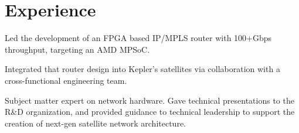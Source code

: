 \documentclass[10pt]{deedy-resume-reversed}
\begin{document}
\begin{minipage}[t]{1.0\textwidth}


\vspace{\topsep} %
\section{Experience}
\newline
{}
\vspace{\topsep} %
\begin{tightemize}
\item Led the development of an FPGA based IP/MPLS router with 100+Gbps throughput, targeting an AMD MPSoC.
\item Integrated that router design into Kepler's satellites via collaboration with a cross-functional engineering team.
\item Subject matter expert on network hardware. Gave technical presentations to the R\&D organization, and
provided guidance to technical leadership to support the creation of next-gen satellite network architecture.
\end{tightemize}
\sectionsep


\end{minipage}
\end{document}
